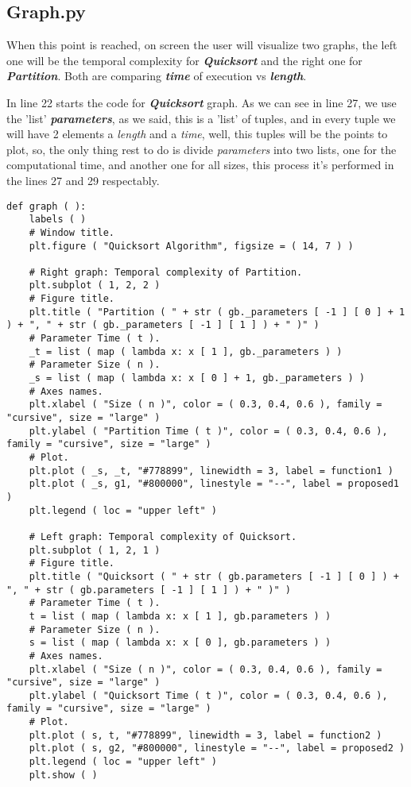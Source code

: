 \subsection{Graph.py}

When this point is reached, on screen the user will visualize two graphs, the left one will be the temporal complexity for {\bfseries\itshape Quicksort} and the right one for {\bfseries\itshape Partition}. Both are comparing {\bfseries\itshape time} of execution vs {\bfseries\itshape length}. \hfill \break

 In line 22 starts the code for {\bfseries\itshape Quicksort} graph. As we can see in line  27, we use the 'list' {\bfseries\itshape parameters}, as we said, this is a 'list' of tuples, and in every tuple we will have 2 elements a {\itshape length} and a {\itshape time}, well, this tuples will be the points to plot, so, the only thing rest to do is divide {\itshape parameters} into two lists, one for the computational time, and another one for all sizes, this process it's performed in the lines 27 and 29 respectably. \hfill \break

\begin{lstlisting}
def graph ( ):
    labels ( )
    # Window title.
    plt.figure ( "Quicksort Algorithm", figsize = ( 14, 7 ) )

    # Right graph: Temporal complexity of Partition.
    plt.subplot ( 1, 2, 2 )
    # Figure title.
    plt.title ( "Partition ( " + str ( gb._parameters [ -1 ] [ 0 ] + 1 ) + ", " + str ( gb._parameters [ -1 ] [ 1 ] ) + " )" )
    # Parameter Time ( t ).
    _t = list ( map ( lambda x: x [ 1 ], gb._parameters ) )
    # Parameter Size ( n ).
    _s = list ( map ( lambda x: x [ 0 ] + 1, gb._parameters ) )
    # Axes names.
    plt.xlabel ( "Size ( n )", color = ( 0.3, 0.4, 0.6 ), family = "cursive", size = "large" )
    plt.ylabel ( "Partition Time ( t )", color = ( 0.3, 0.4, 0.6 ), family = "cursive", size = "large" )
    # Plot.
    plt.plot ( _s, _t, "#778899", linewidth = 3, label = function1 )
    plt.plot ( _s, g1, "#800000", linestyle = "--", label = proposed1 )
    plt.legend ( loc = "upper left" )

    # Left graph: Temporal complexity of Quicksort.
    plt.subplot ( 1, 2, 1 )
    # Figure title.
    plt.title ( "Quicksort ( " + str ( gb.parameters [ -1 ] [ 0 ] ) + ", " + str ( gb.parameters [ -1 ] [ 1 ] ) + " )" )
    # Parameter Time ( t ).
    t = list ( map ( lambda x: x [ 1 ], gb.parameters ) )
    # Parameter Size ( n ).
    s = list ( map ( lambda x: x [ 0 ], gb.parameters ) )
    # Axes names.
    plt.xlabel ( "Size ( n )", color = ( 0.3, 0.4, 0.6 ), family = "cursive", size = "large" )
    plt.ylabel ( "Quicksort Time ( t )", color = ( 0.3, 0.4, 0.6 ), family = "cursive", size = "large" )
    # Plot.
    plt.plot ( s, t, "#778899", linewidth = 3, label = function2 )
    plt.plot ( s, g2, "#800000", linestyle = "--", label = proposed2 )
    plt.legend ( loc = "upper left" )
    plt.show ( )
\end{lstlisting} \hfill

